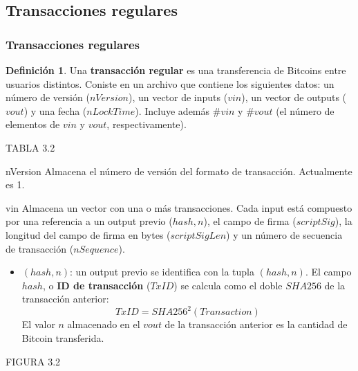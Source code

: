 \documentclass{beamer}
\theoremstyle{definition}
\newtheorem{defi}{Definición}
\begin{document}
\subsection{Transacciones regulares}
\begin{frame}
\frametitle{Transacciones regulares}
\begin{defi}
	Una \textbf{transacción regular} es una transferencia de Bitcoins entre usuarios distintos. Coniste en un archivo que contiene los siguientes datos: un número de versión ($nVersion$), un vector de inputs ($vin$), un vector de outputs ($vout$) y una fecha ($nLockTime$). Incluye además $\# vin$ y $\# vout$ (el número de elementos de $vin$ y $vout$, respectivamente). 
\end{defi}

\end{frame}

\begin{frame}
	TABLA 3.2
\end{frame}


\begin{frame}
	\begin{block}{nVersion}
		Almacena el número de versión del formato de transacción. Actualmente es 1.
	\end{block}\pause

\begin{block}{vin}
	Almacena un vector con una o más transacciones. Cada input está compuesto por una referencia a un output previo ($hash,n$), el campo de firma ($scriptSig$), la longitud del campo de firma en bytes ($scriptSigLen$) y un número de secuencia de transacción ($nSequence$).
\end{block}
\end{frame}

\begin{frame}
\begin{itemize}
	\item<1-> $(hash,n)$: un output previo se identifica con la tupla $(hash,n)$. El campo $hash$, o \textbf{ID de transacción} ($TxID$) se calcula como el doble $SHA256$ de la transacción anterior: $$TxID=SHA256^2(Transaction)$$
	El valor $n$ almacenado en el $vout$ de la transacción anterior es la cantidad de Bitcoin transferida.
\end{itemize}
\end{frame}

\begin{frame}
	FIGURA 3.2
\end{frame}
\end{document}
